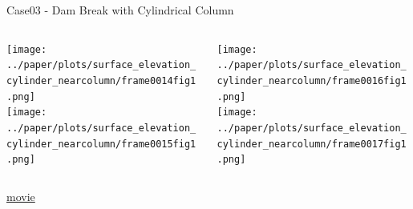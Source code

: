 \documentclass[xcolor=dvipsnames]{beamer}
\begin{document}
\begin{frame}[label=sec-5-6]{Case03 - Dam Break with Cylindrical Column}
\begin{columns}
\begin{column}{0.5\textwidth}
\begin{block}{}
\texttt{[image: ../paper/plots/surface\_elevation\_cylinder\_nearcolumn/frame0014fig1.png]}\\
    \texttt{[image: ../paper/plots/surface\_elevation\_cylinder\_nearcolumn/frame0015fig1.png]}\\
\end{block}
\end{column}

\begin{column}{0.5\textwidth}
\begin{block}{}
\texttt{[image: ../paper/plots/surface\_elevation\_cylinder\_nearcolumn/frame0016fig1.png]}\\
    \texttt{[image: ../paper/plots/surface\_elevation\_cylinder\_nearcolumn/frame0017fig1.png]}\\
\end{block}
\end{column}
\end{columns}

\begin{block}{}
\href{../paper/plots/animation/surface_elevation_cylinder_nearcolumn.mp4}{movie}
\end{block}
\end{frame}
\end{document}
